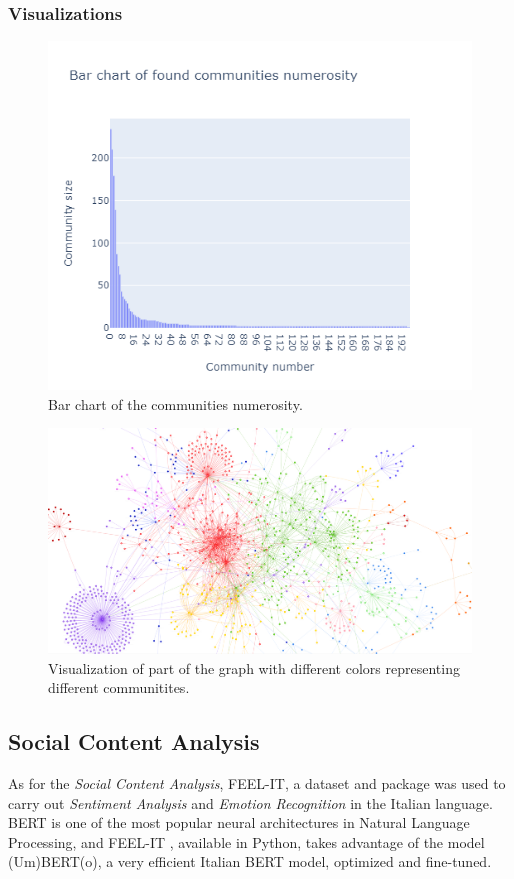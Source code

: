 \documentclass[12pt,journal,compsoc]{IEEEtran}
\begin{document}
\subsubsection{Visualizations}
\begin{figure}[H]
	\includegraphics[scale=.5]{./images/newplot.png}
	\caption{Bar chart of the communities numerosity.}
\end{figure}

\begin{figure}[H]
	\includegraphics[scale=.20]{./images/graph_visualization.png}
	\caption{Visualization of part of the graph with different colors representing different communitites.}
\end{figure}

\subsection{Social Content Analysis}
As for the \textit{Social Content Analysis}, FEEL-IT, a dataset and package was used to carry out \textit{Sentiment Analysis} and \textit{Emotion Recognition} in the Italian language.\\
BERT is one of the most popular neural architectures in Natural Language Processing, and FEEL-IT \cite{FEEL-IT}, available in Python, takes advantage of the model (Um)BERT(o), a very efficient Italian BERT model, optimized and fine-tuned.
\end{document}
